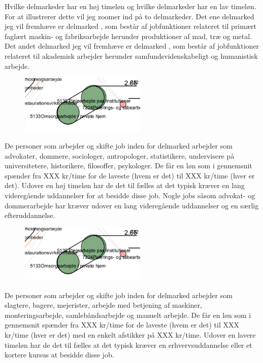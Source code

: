 Hvilke delmarkeder har en høj timeløn og hvilke delmarkeder har en lav timeløn. For at illustrerer dette vil jeg zoomer ind på to delmarkeder. Det ene delmarked jeg vil fremhæve er delmarked , som består af jobfunktioner relateret til primært faglært maskin- og fabriksarbejde herunder produktioner af mad, træ og metal. Det andet delmarked jeg vil fremhæve er delmarked , som består af jobfunktioner relateret til akademisk arbejder herunder samfundsvidenskabeligt og humanistisk arbejde.
%
\begin{figure}
  \vspace{-20pt}
  \begin{center}
    \includegraphics[width=6cm]{fig/segzoom/seg_2_66.pdf}
   \caption{}
   \label{fig_delanalyse1_zoom_2_66}
  \end{center}
  \vspace{-20pt}
\end{figure}
%
De personer som arbejder og skifte job inden for delmarked  arbejder som advokater, dommere, sociologer, antropologer, statistikere, undervisere på universitetere, historikere, filosoffer, psykologer. De får en løn som i gennemsnit spænder fra XXX kr/time for de laveste (hvem er det) til XXX kr/time (hver er det). Udover en høj timeløn har de det til fælles at det typisk kræver en lang videregående uddannelser for at besidde disse job. Nogle jobs såsom advokat- og dommerarbejde har kræver udover en lang videregående uddannelser og en særlig efteruddannelse.
%
\begin{figure}
  \vspace{-20pt}
  \begin{center}
    \includegraphics[width=6cm]{fig/segzoom/seg_2_66.pdf}
   \caption{}
   \label{fig_delanalyse1_zoom_2_66}
  \end{center}
  \vspace{-20pt}
\end{figure}
%
De personer som arbejder og skifte job inden for delmarked  arbejder som slagtere, bagere, mejerister, arbejde med betjening af maskiner, monteringsarbejde, samlebåndsarbejde og manuelt arbejde. De får en løn som i gennemsnit spænder fra XXX kr/time for de laveste (hvem er det) til XXX kr/time (hver er det) med en enkelt afstikker på XXX kr/time. Udover en lavere timeløn har de det til fælles at det typisk kræver en erhvervsuddannelse eller et kortere kursus at besidde disse job.

